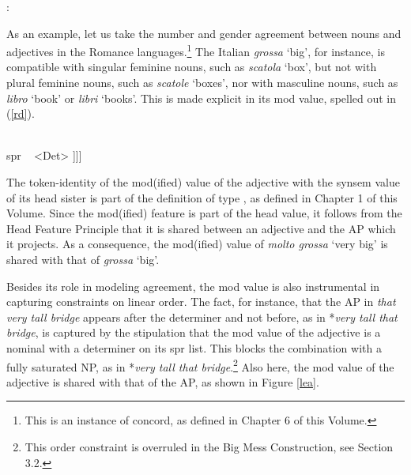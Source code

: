 \documentclass[output=paper]{langsci/langscibook}
\begin{document}
\begin{exe} 
\ex   {}: \begin{avm} 
                          \end{avm} 
\end{exe} 

\noindent
As an example, let us take the number and gender agreement 
between nouns and adjectives in the Romance languages.\footnote{This is an 
instance of concord, as defined in 
Chapter 6 of this Volume.}  
The Italian \emph{grossa} `big', for instance, 
is compatible with singular feminine nouns, such as \emph{scatola} `box', 
but not with plural feminine nouns, such as \emph{scatole} `boxes', nor
with masculine nouns, such as \emph{libro} `book' or \emph{libri} `books'. 
This is made explicit in its {\sc mod} value, spelled out in (\ref{rd}). 

\begin{exe} 
\ex\label{rd}
\begin{avm}
[\type{category}                              \\
 head [\type{adjective}                         \\
       mod|loc|cat [head [\type{noun}          \\
                          number ~ \type{sing} \\
                          gender ~ \type{fem}] \\
                    spr ~ <Det> ]]]
\end{avm}
\end{exe}

\noindent
The token-identity of the {\sc mod(ified)} value of the adjective
with the {\sc synsem} value of its head sister is part of the 
definition of type , as defined in 
Chapter 1 of this Volume. 
Since the {\sc mod(ified)} feature is part of the {\sc head} value, it follows from the 
Head Feature Principle that it is shared between an adjective 
and the AP which it projects. As a consequence, the {\sc mod(ified)} value of 
\emph{molto grossa} `very big' is shared with that of \emph{grossa} `big'. 
 
Besides its role in modeling agreement, the {\sc mod} value is also instrumental 
in capturing constraints on linear order.  
The fact, for instance, that the AP in \emph{that very tall bridge} appears 
after the determiner and not before, as in *\emph{very tall that bridge},
is captured by the stipulation that the {\sc mod} value of the adjective 
is a nominal with a determiner on its {\sc spr} list. This blocks the 
combination with a fully saturated NP, as in 
*\emph{very tall that bridge}.\footnote{This order constraint is overruled in 
the Big Mess Construction, see Section 3.2.} Also here, the {\sc mod} value of 
the adjective is shared with that of the AP, as shown in Figure \ref{lea}. 
\end{document}
